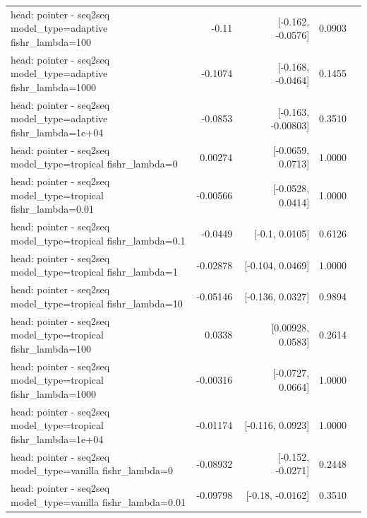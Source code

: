 \documentclass[10pt]{article}
\makeatletter
\newcommand{\stackcell}[1]{\begin{tabular}[t]{@{}l@{}}#1\end{tabular}}
\makeatother
\begin{document}
{\begin{longtable}{lrrrl}
\stackcell{head: pointer - seq2seq\\\footnotesize model\_type=adaptive fishr\_lambda=100 } & -0.11 & [-0.162, -0.0576] & 0.0903 & \\
\stackcell{head: pointer - seq2seq\\\footnotesize model\_type=adaptive fishr\_lambda=1000 } & -0.1074 & [-0.168, -0.0464] & 0.1455 & \\
\stackcell{head: pointer - seq2seq\\\footnotesize model\_type=adaptive fishr\_lambda=1e+04 } & -0.0853 & [-0.163, -0.00803] & 0.3510 & \\
\stackcell{head: pointer - seq2seq\\\footnotesize model\_type=tropical fishr\_lambda=0 } & 0.00274 & [-0.0659, 0.0713] & 1.0000 & \\
\stackcell{head: pointer - seq2seq\\\footnotesize model\_type=tropical fishr\_lambda=0.01 } & -0.00566 & [-0.0528, 0.0414] & 1.0000 & \\
\stackcell{head: pointer - seq2seq\\\footnotesize model\_type=tropical fishr\_lambda=0.1 } & -0.0449 & [-0.1, 0.0105] & 0.6126 & \\
\stackcell{head: pointer - seq2seq\\\footnotesize model\_type=tropical fishr\_lambda=1 } & -0.02878 & [-0.104, 0.0469] & 1.0000 & \\
\stackcell{head: pointer - seq2seq\\\footnotesize model\_type=tropical fishr\_lambda=10 } & -0.05146 & [-0.136, 0.0327] & 0.9894 & \\
\stackcell{head: pointer - seq2seq\\\footnotesize model\_type=tropical fishr\_lambda=100 } & 0.0338 & [0.00928, 0.0583] & 0.2614 & \\
\stackcell{head: pointer - seq2seq\\\footnotesize model\_type=tropical fishr\_lambda=1000 } & -0.00316 & [-0.0727, 0.0664] & 1.0000 & \\
\stackcell{head: pointer - seq2seq\\\footnotesize model\_type=tropical fishr\_lambda=1e+04 } & -0.01174 & [-0.116, 0.0923] & 1.0000 & \\
\stackcell{head: pointer - seq2seq\\\footnotesize model\_type=vanilla fishr\_lambda=0 } & -0.08932 & [-0.152, -0.0271] & 0.2448 & \\
\stackcell{head: pointer - seq2seq\\\footnotesize model\_type=vanilla fishr\_lambda=0.01 } & -0.09798 & [-0.18, -0.0162] & 0.3510 & \\

\end{longtable}}
\end{document}
